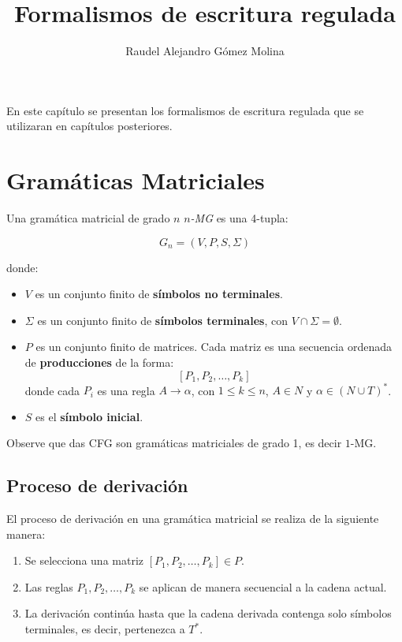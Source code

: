 \documentclass[12pt]{article}
\title{Formalismos de escritura regulada}
\author{Raudel Alejandro Gómez Molina}
\begin{document}
\maketitle

En este capítulo se presentan los formalismos de escritura regulada que se utilizaran en capítulos posteriores.

\section{Gramáticas Matriciales}

Una gramática matricial \cite{simpleMatrixLanguages} de grado $n$ \textit{$n$-MG} es una 4-tupla:

\[
    G_n = (V, P, S,\Sigma)
\]

donde:
\begin{itemize}
    \item \( V \) es un conjunto finito de \textbf{símbolos no terminales}.
    \item \( \Sigma \) es un conjunto finito de \textbf{símbolos terminales}, con \( V \cap \Sigma = \emptyset \).
    \item \( P \) es un conjunto finito de matrices. Cada matriz es una secuencia ordenada de \textbf{producciones} de la forma:
          \[
              [P_1, P_2, \dots, P_k]
          \]
          donde cada \( P_i \) es una regla \( A \to \alpha \), con $1\leq k\leq n$, \( A \in N \) y \( \alpha \in (N \cup T)^* \).
    \item \( S  \) es el \textbf{símbolo inicial}.
\end{itemize}

Observe que das CFG son gramáticas matriciales de grado 1, es decir $1$-MG.

\subsection{Proceso de derivación}

El proceso de derivación en una gramática matricial se realiza de la siguiente manera:
\begin{enumerate}
    \item Se selecciona una matriz \( [P_1, P_2, \dots, P_k] \in P \).
    \item Las reglas \( P_1, P_2, \dots, P_k \) se aplican de manera secuencial a la cadena actual.
    \item La derivación continúa hasta que la cadena derivada contenga solo símbolos terminales, es decir, pertenezca a \( T^* \).
\end{enumerate}
\end{document}
